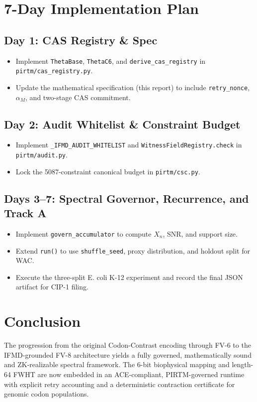 \documentclass[11pt]{article}
\begin{document}
\section{7-Day Implementation Plan}

\subsection{Day 1: CAS Registry \& Spec}

\begin{itemize}[noitemsep]
  \item Implement \texttt{ThetaBase}, \texttt{ThetaC6}, and
  \texttt{derive\_cas\_registry} in \texttt{pirtm/cas\_registry.py}.
  \item Update the mathematical specification (this report) to include
  \texttt{retry\_nonce}, $\alpha_M$, and two-stage CAS commitment.
\end{itemize}

\subsection{Day 2: Audit Whitelist \& Constraint Budget}

\begin{itemize}[noitemsep]
  \item Implement \texttt{\_IFMD\_AUDIT\_WHITELIST} and
  \texttt{WitnessFieldRegistry.check} in \texttt{pirtm/audit.py}.
  \item Lock the 5087-constraint canonical budget in \texttt{pirtm/csc.py}.
\end{itemize}

\subsection{Days 3--7: Spectral Governor, Recurrence, and Track A}

\begin{itemize}[noitemsep]
  \item Implement \texttt{govern\_accumulator} to compute $X_n$, SNR, and support size.
  \item Extend \texttt{run()} to use \texttt{shuffle\_seed}, proxy distribution,
  and holdout split for WAC.
  \item Execute the three-split E. coli K-12 experiment and record the final
  JSON artifact for CIP-1 filing.
\end{itemize}

\section{Conclusion}

The progression from the original Codon-Contrast encoding through FV-6 to
the IFMD-grounded FV-8 architecture yields a fully governed, mathematically
sound and ZK-realizable spectral framework. The 6-bit biophysical mapping and
length-64 FWHT are now embedded in an ACE-compliant, PIRTM-governed runtime
with explicit retry accounting and a deterministic contraction certificate
for genomic codon populations.

\nocite{*}

 
\end{document}
